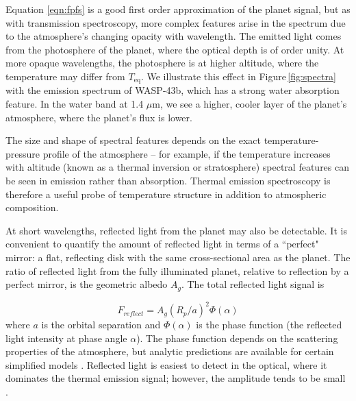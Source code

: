 \documentclass[graybox,natbib,nosecnum]{svmult}
\newcommand{\hbindex}[1]{\hl{#1}\index{#1}}  %
\begin{document}
Equation \ref{eqn:fpfs} is a good first order approximation of the planet signal, but as with transmission spectroscopy, more complex features arise in the spectrum due to the atmosphere's changing opacity with wavelength. The emitted light comes from the photosphere of the planet, where the optical depth is of order unity. At more opaque wavelengths, the photosphere is at higher altitude, where the temperature may differ from $T_\mathrm{eq}$. We illustrate this effect in Figure\,\ref{fig:spectra} with the emission spectrum of WASP-43b, which has a strong water absorption feature. In the water band at 1.4 $\mu$m, we see a higher, cooler layer of the planet's atmosphere, where the planet's flux is lower.

The size and shape of spectral features depends on the exact temperature-pressure profile of the atmosphere -- for example, if the temperature increases with altitude (known as a thermal inversion or stratosphere) spectral features can be seen in emission rather than absorption. Thermal emission spectroscopy is therefore a useful probe of temperature structure in addition to atmospheric composition.


At short wavelengths, reflected light from the planet may also be detectable. It is convenient to quantify the amount of reflected light in terms of a ``perfect" mirror: a flat, reflecting disk with the same cross-sectional area as the planet. The ratio of reflected light from the fully illuminated planet, relative to reflection by a perfect mirror, is the geometric albedo $A_g$. The total reflected light signal is

\begin{equation}
F_{reflect} = A_g(R_p/a)^2 \Phi(\alpha)
\end{equation}
where $a$ is the orbital separation and $\Phi(\alpha)$ is the phase function (the reflected light intensity at phase angle $\alpha$). The phase function depends on the scattering properties of the atmosphere, but analytic predictions are available for certain simplified models \citep[e.g.][]{madhu12}.  Reflected light is easiest to detect in the optical, where it dominates the thermal emission signal; however, the amplitude tends to be small \citep[typically less than 100 ppm;][]{angerhausen15}.
\end{document}
